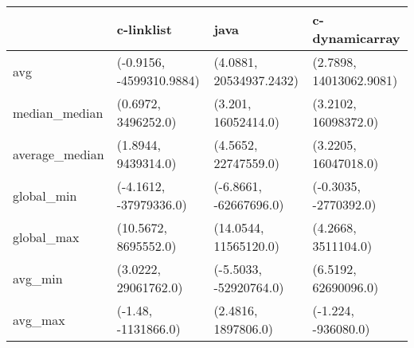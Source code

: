 \begin{tabular}{llll}
\toprule
{} &                c-linklist &                     java &           c-dynamicarray \\
\midrule
avg            &  (-0.9156, -4599310.9884) &  (4.0881, 20534937.2432) &  (2.7898, 14013062.9081) \\
median\_median  &       (0.6972, 3496252.0) &      (3.201, 16052414.0) &     (3.2102, 16098372.0) \\
average\_median &       (1.8944, 9439314.0) &     (4.5652, 22747559.0) &     (3.2205, 16047018.0) \\
global\_min     &    (-4.1612, -37979336.0) &   (-6.8661, -62667696.0) &    (-0.3035, -2770392.0) \\
global\_max     &      (10.5672, 8695552.0) &    (14.0544, 11565120.0) &      (4.2668, 3511104.0) \\
avg\_min        &      (3.0222, 29061762.0) &   (-5.5033, -52920764.0) &     (6.5192, 62690096.0) \\
avg\_max        &       (-1.48, -1131866.0) &      (2.4816, 1897806.0) &      (-1.224, -936080.0) \\
\bottomrule
\end{tabular}
